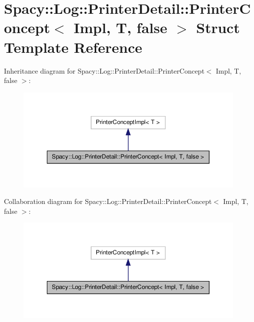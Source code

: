 \hypertarget{structSpacy_1_1Log_1_1PrinterDetail_1_1PrinterConcept_3_01Impl_00_01T_00_01false_01_4}{\section{\-Spacy\-:\-:\-Log\-:\-:\-Printer\-Detail\-:\-:\-Printer\-Concept$<$ \-Impl, \-T, false $>$ \-Struct \-Template \-Reference}
\label{structSpacy_1_1Log_1_1PrinterDetail_1_1PrinterConcept_3_01Impl_00_01T_00_01false_01_4}
}


\-Inheritance diagram for \-Spacy\-:\-:\-Log\-:\-:\-Printer\-Detail\-:\-:\-Printer\-Concept$<$ \-Impl, \-T, false $>$\-:
\nopagebreak
\begin{figure}[H]
\begin{center}
\leavevmode
\includegraphics[width=350pt]{structSpacy_1_1Log_1_1PrinterDetail_1_1PrinterConcept_3_01Impl_00_01T_00_01false_01_4__inherit__graph}
\end{center}
\end{figure}


\-Collaboration diagram for \-Spacy\-:\-:\-Log\-:\-:\-Printer\-Detail\-:\-:\-Printer\-Concept$<$ \-Impl, \-T, false $>$\-:
\nopagebreak
\begin{figure}[H]
\begin{center}
\leavevmode
\includegraphics[width=350pt]{structSpacy_1_1Log_1_1PrinterDetail_1_1PrinterConcept_3_01Impl_00_01T_00_01false_01_4__coll__graph}
\end{center}
\end{figure}
